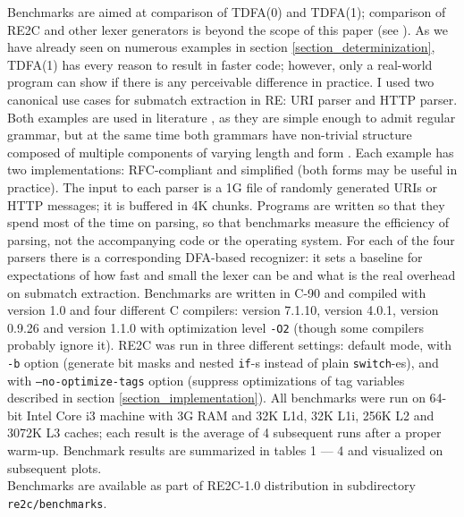 \documentclass{article}
\theoremstyle{definition}
\begin{document}
\begin{multicols}{2}
Benchmarks are aimed at comparison of TDFA(0) and TDFA(1);
comparison of RE2C and other lexer generators is beyond the scope of this paper (see \cite{BC93}).
As we have already seen on numerous examples in section \ref{section_determinization},
TDFA(1) has every reason to result in faster code;
however, only a real-world program can show if there is any perceivable difference in practice.
I used two canonical use cases for submatch extraction in RE: URI parser and HTTP parser.
Both examples are used in literature \cite{BT10} \cite{GHRST16},
as they are simple enough to admit regular grammar,
but at the same time both grammars have non-trivial structure composed of multiple components of varying length and form \cite{RFC-3986} \cite{RFC-7230}.
Each example has two implementations: RFC-compliant and simplified (both forms may be useful in practice).
The input to each parser is a 1G file of randomly generated URIs or HTTP messages; it is buffered in 4K chunks.
Programs are written so that they spend most of the time on parsing,
so that benchmarks measure the efficiency of parsing, not the accompanying code or the operating system.
For each of the four parsers there is a corresponding DFA-based recognizer:
it sets a baseline for expectations of how fast and small the lexer can be and what is the real overhead on submatch extraction.
Benchmarks are written in C-90 and compiled with \cite{RE2C} version 1.0
and four different C compilers:
\cite{GCC} version 7.1.10,
\cite{Clang} version 4.0.1,
\cite{TCC} version 0.9.26
and \cite{PCC} version 1.1.0
with optimization level \texttt{-O2} (though some compilers probably ignore it).
RE2C was run in three different settings:
default mode, with \texttt{-b} option (generate bit masks and nested \texttt{if}-s instead of plain \texttt{switch}-es),
and with \texttt{--no-optimize-tags} option (suppress optimizations of tag variables described in section \ref{section_implementation}).
All benchmarks were run on 64-bit Intel Core i3 machine with 3G RAM and 32K L1d, 32K L1i, 256K L2 and 3072K L3 caches;
each result is the average of 4 subsequent runs after a proper warm-up.
Benchmark results are summarized in tables 1 --- 4
and visualized on subsequent plots.
\\

Benchmarks are available as part of RE2C-1.0 distribution
in subdirectory \texttt{re2c/benchmarks}.

\end{multicols}
\end{document}
